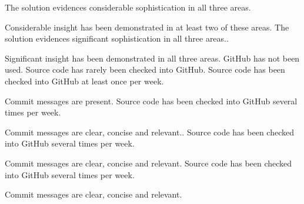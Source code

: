 \documentclass{../../fal_assignment}
\begin{document}
\begin{markingrubric}
		\grade The solution evidences considerable sophistication in all three areas.
		\par Considerable insight has been demonstrated in at least two of these areas.
		\grade The solution evidences significant sophistication in all three areas..
		\par Significant insight has been demonstrated in all three areas.
		\grade\fail GitHub has not been used.
		\grade Source code has rarely been checked into GitHub.
		\grade Source code  has been checked into GitHub at least once per week.
		\par Commit messages are present.
		\grade Source code  has been checked into GitHub several times per week.
		\par Commit messages are clear, concise and relevant..
		\grade Source code has been checked into GitHub several times per week.
		\par Commit messages are clear, concise and relevant.
		\grade Source code has been checked into GitHub several times per week.
		\par Commit messages are clear, concise and relevant.
	\end{markingrubric}
	
\end{document}
